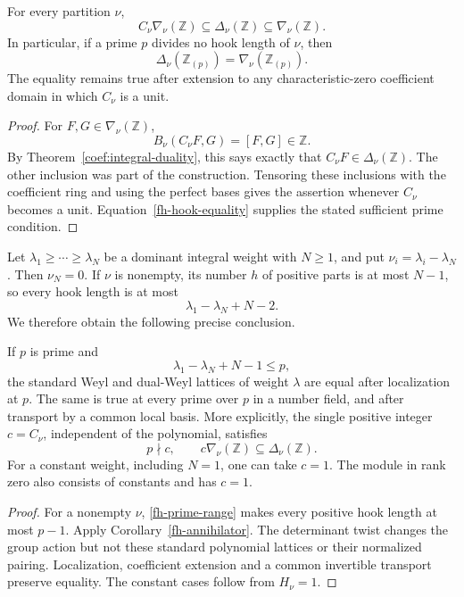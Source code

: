 \begin{corollary}\label{fh-annihilator}
For every partition $\nu$,
\begin{equation}\label{fh-inclusions}
              C_\nu\nabla_\nu(\mathbb Z)
                    \subseteq\Delta_\nu(\mathbb Z)
                    \subseteq\nabla_\nu(\mathbb Z).
\end{equation}
In particular, if a prime $p$ divides no hook length of $\nu$,
then
\[
                \Delta_\nu(\mathbb Z_{(p)})
                          =\nabla_\nu(\mathbb Z_{(p)}).
\]
The equality remains true after extension to any
characteristic-zero coefficient domain in which $C_\nu$ is a unit.
\end{corollary}
\begin{proof}
For $F,G\in\nabla_\nu(\mathbb Z)$,
\[
                   B_\nu(C_\nu F,G)=[F,G]\in\mathbb Z.
\]
By Theorem~\ref{coef:integral-duality}, this says exactly that
$C_\nu F\in\Delta_\nu(\mathbb Z)$. The other inclusion was
part of the construction. Tensoring these inclusions with the
coefficient ring and using the perfect bases gives the assertion
whenever $C_\nu$ becomes a unit. Equation~\eqref{fh-hook-equality}
supplies the stated sufficient prime condition.
\end{proof}

Let $\lambda_1\ge\cdots\ge\lambda_N$ be a dominant integral
weight with $N\ge1$, and put $\nu_i=\lambda_i-\lambda_N$.
Then $\nu_N=0$. If $\nu$ is nonempty, its number $h$ of
positive parts is at most $N-1$, so every hook length is at most
\[
                          \lambda_1-\lambda_N+N-2.
\]
We therefore obtain the following precise conclusion.

\begin{corollary}\label{fh-large-prime-equality}
If $p$ is prime and
\begin{equation}\label{fh-prime-range}
                       \lambda_1-\lambda_N+N-1\le p,
\end{equation}
the standard Weyl and dual-Weyl lattices of weight $\lambda$
are equal after localization at $p$. The same is true at every
prime over $p$ in a number field, and after transport by a common
local basis. More explicitly, the single positive integer
$c=C_\nu$, independent of the polynomial, satisfies
\[
       p\nmid c,\qquad
       c\nabla_\nu(\mathbb Z)\subseteq\Delta_\nu(\mathbb Z).
\]
For a constant weight, including $N=1$, one can take $c=1$.
The module in rank zero also consists of constants and has $c=1$.
\end{corollary}
\begin{proof}
For a nonempty $\nu$, \eqref{fh-prime-range} makes every
positive hook length at most $p-1$. Apply
Corollary~\ref{fh-annihilator}. The determinant twist changes
the group action but not these standard polynomial lattices or
their normalized pairing. Localization, coefficient extension
and a common invertible transport preserve equality.
The constant cases follow from $H_\nu=1$.
\end{proof}

